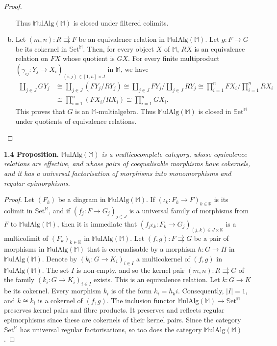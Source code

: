 \documentclass{article}
\newenvironment{itenv}[1]
  {\phantomsection\par\medskip\noindent\textbf{#1.}\itshape}
  {\medskip}
\newcommand{\bb}[1]{{\mathbb{#1}}}
\newcommand{\Set}{\mathbb{S}\mathrm{et}}
\newcommand{\MulAlg}{\mathbb{M}\mathrm{ulAlg}}
\newcommand{\oldpage}[1]{\marginpar{\footnotesize$\Big\vert$ \textit{p.~#1}}}
\begin{document}
\begin{proof}
\begin{enumerate}[a)]
      Thus $\MulAlg(\bb{M})$ is closed under filtered colimits.
    \item Let $(m,n)\colon R\rightrightarrows F$ be an equivalence relation in $\MulAlg(\bb{M})$.
      Let $g\colon F\to G$ be its cokernel in $\Set^\bb{M}$.
      Then, for every object $X$ of $\bb{M}$, $RX$ is an equivalence relation on $FX$ whose quotient is $GX$.
      For every finite multiproduct $(\gamma_{ij}\colon Y_j\to X_i)_{(i,j)\in[1,n]\times J}$ in $\bb{M}$, we have
      \[
        \begin{aligned}
          \coprod_{j\in J} GY_j
          &\cong \coprod_{j\in J} (FY_j/RY_j)
          \cong \coprod_{j\in J} FY_j \Big/ \coprod_{j\in J} RY_j
          \cong \prod_{i=1}^n FX_i \Big/ \prod_{i=1}^n RX_i
        \\&\cong \prod_{i=1}^n (FX_i/RX_i)
          \cong \prod_{i=1}^n GX_i.
        \end{aligned}
      \]
      This proves that $G$ is an $\bb{M}$-multialgebra.
      Thus $\MulAlg(\bb{M})$ is closed in $\Set^\bb{M}$ under quotients of equivalence relations.
  \end{enumerate}
\end{proof}

\oldpage{199}
\begin{itenv}{1.4 Proposition}
  $\MulAlg(\bb{M})$ is a multicocomplete category, whose equivalence relations are effective, and whose pairs of coequalisable morphisms have cokernels, and it has a universal factorisation of morphisms into monomorphisms and regular epimorphisms.
\end{itenv}

\begin{proof}
  Let $(F_k)$ be a diagram in $\MulAlg(\bb{M})$.
  If $(\iota_k\colon F_k\to F)_{k\in\bb{K}}$ is its colimit in $\Set^\bb{M}$, and if $(f_j\colon F\to G_j)_{j\in J}$ is a universal family of morphisms from $F$ to $\MulAlg(\bb{M})$, then it is immediate that $(f_j\iota_k\colon F_k\to G_j)_{(j,k)\in J\times\bb{K}}$ is a multicolimit of $(F_k)_{k\in\bb{K}}$ in $\MulAlg(\bb{M})$.
  Let $(f,g)\colon F\rightrightarrows G$ be a pair of morphisms in $\MulAlg(\bb{M})$ that is coequalisable by a morphism $h\colon G\to H$ in $\MulAlg(\bb{M})$.
  Denote by $(k_i\colon G\to K_i)_{i\in I}$ a multicokernel of $(f,g)$ in $\MulAlg(\bb{M})$.
  The set $I$ is non-empty, and so the kernel pair $(m,n)\colon R\rightrightarrows G$ of the family $(k_i\colon G\to K_i)_{i\in I}$ exists.
  This is an equivalence relation.
  Let $k\colon G\to K$ be its cokernel.
  Every morphism $k_i$ is of the form $k_i=h_ki$.
  Consequently, $|I|=1$, and $k\cong k_i$ is a cokernel of $(f,g)$.
  The inclusion functor $\MulAlg(\bb{M})\to\Set^\bb{M}$ preserves kernel pairs and fibre products.
  It preserves and reflects regular epimorphisms since these are cokernels of their kernel pairs.
  Since the category $\Set^\bb{M}$ has universal regular factorisations, so too does the category $\MulAlg(\bb{M})$.
\end{proof}
\end{document}
